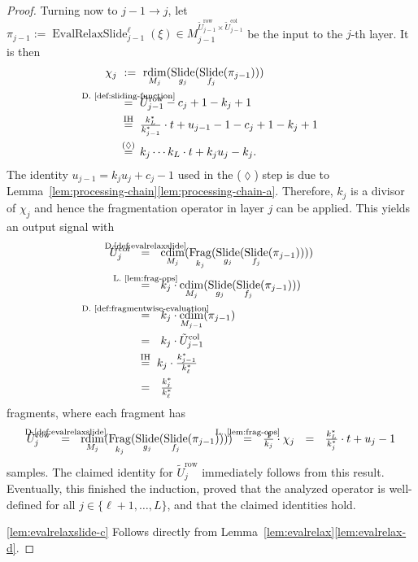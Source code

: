 \documentclass[journal]{IEEEtran}
\newcommand{\discint}[2]{\{#1,\dotsc,#2\}}
\newcommand{\inint}[2]{\in\discint{#1}{#2}}
\DeclareMathOperator{\rdim}{rdim}
\DeclareMathOperator{\cdim}{cdim}
\DeclareMathOperator{\Slide}{Slide}
\DeclareMathOperator{\Fragmentation}{Frag}
\newcommand{\row}{\operatorname{row}}
\newcommand{\col}{\operatorname{col}}
\newcommand{\equsing}[1]{\overset{\mathclap{\text{#1}}}{=}}
\DeclareMathOperator{\EvalRelaxSlide}{EvalRelaxSlide}
\begin{document}
\begin{proof}
Turning now to $j - 1 \to j$, let $\pi_{j - 1} := \EvalRelaxSlide_{j - 1}^\ell(\xi)\in M_{j - 1}^{\tilde{U}_{j - 1}^{\row} \times \tilde{U}_{j - 1}^{\col}}$ be the input to the $j$-th layer.
It is then
\begin{align*}
  \chi_j\ &:=\ \rdim_{M_j}(\Slide_{g_j}(\Slide_{f_j}(\pi_{j - 1})))\\
  &\equsing{D.~\ref{def:sliding-function}}\ \tilde{U}_{j - 1}^{\row} - c_j + 1 - k_j + 1\\
  &\equsing{IH}\ \tfrac{k_L^*}{k_{j - 1}^*}\cdot t + u_{j - 1} - 1 - c_j + 1 - k_j + 1\\
  &\equsing{($\lozenge$)}\ k_j\cdots k_L\cdot t + k_ju_j - k_j\text{.}
\end{align*}
The identity $u_{j - 1} = k_ju_j + c_j - 1$ used in the ($\lozenge$) step is due to Lemma~\ref{lem:processing-chain}\ref{lem:processing-chain-a}.
Therefore, $k_j$ is a divisor of $\chi_j$ and hence the fragmentation operator in layer $j$ can be applied.
This yields an output signal with
\begin{align*}
  \tilde{U}_j^{\col}\ \ &\equsing{D.\ref{def:evalrelaxslide}}\ \ \cdim_{M_j}(\Fragmentation_{k_j}(\Slide_{g_j}(\Slide_{f_j}(\pi_{j - 1}))))\\
  &\equsing{L.~\ref{lem:frag-ops}}\ \ k_j\cdot \cdim_{M_j}(\Slide_{g_j}(\Slide_{f_j}(\pi_{j - 1})))\\
  &\equsing{D.~\ref{def:fragmentwise-evaluation}}\ \ k_j\cdot \cdim_{M_{j - 1}}(\pi_{j - 1})\\
  &=\ \ k_j\cdot \tilde{U}_{j - 1}^{\col}\\
  &\equsing{IH}\ k_j\cdot\tfrac{k_{j - 1}^*}{k_\ell^*}\\
  &=\ \ \tfrac{k_j^*}{k_\ell^*}
\end{align*}
fragments, where each fragment has
\begin{displaymath}
  \tilde{U}_j^{\row}
  \ \ \equsing{D.\ref{def:evalrelaxslide}}\ \ \rdim_{M_j}(\Fragmentation_{k_j}(\Slide_{g_j}(\Slide_{f_j}(\pi_{j - 1}))))
  \ \ \equsing{L.~\ref{lem:frag-ops}}\ \ \tfrac{1}{k_j}\cdot\chi_j
  \ \ =\ \ \tfrac{k_L^*}{k_j^*}\cdot t + u_j - 1
\end{displaymath}
samples.
The claimed identity for $\tilde{U}_j^{\row}$ immediately follows from this result.
Eventually, this finished the induction, proved that the analyzed operator is well-defined for all $j\inint{\ell + 1}{L}$, and that the claimed identities hold.

\ref{lem:evalrelaxslide-c}
Follows directly from Lemma~\ref{lem:evalrelax}\ref{lem:evalrelax-d}.


\end{proof}
\end{document}
